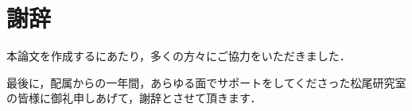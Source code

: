 \chapter*{謝辞}
\label{chap:acknowledgments}
本論文を作成するにあたり，多くの方々にご協力をいただきました．

最後に，配属からの一年間，あらゆる面でサポートをしてくださった松尾研究室の皆様に御礼申しあげて，謝辞とさせて頂きます．